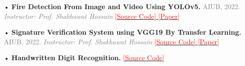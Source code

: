 \vspace{0.5\baselineskip} %

\begin{mycventryy}
{•{\textcolor{text}{\fontsize{8.5}{8.5} \textbf{\hspace{0.4em} \hspace{0.4em}Fire Detection From Image and Video Using YOLOv5. }}}\textcolor{graytext}{\fontsize{8}{8}\textnormal{ AIUB, 2022. \textit{ Instructor: Prof. Shakhawat Hossain}}}
  \href{https://github.com/aarafat27/Fire-Detection-Using-YOLOv5.git}{\textcolor{red}{\fontsize{8}{8}\textnormal{ [Source Code]}}}\href{https://arxiv.org/abs/2310.06351}{\textcolor{red}{\fontsize{8}{8}\textnormal{  [Paper]}}}}
\end{mycventryy}

\vspace{4pt} %

\begin{mycventryy}
  {•{\textcolor{text}{\fontsize{8.5}{8.5} \textbf{\hspace{0.4em} \hspace{0.4em}Signature Verification System using VGG19 By Transfer Learning. }}}\textcolor{graytext}{\fontsize{8}{8}\textnormal{ AIUB, 2022. \textit{ Instructor:  Prof. Shakhawat Hossain}}}
  \href{https://github.com/imtiazhabib17/Signature-Verification-Using-VGG19-By-Transfer-Learning}{\textcolor{red}{\fontsize{8}{8}\textnormal{ [Source Code]}}}\href{https://github.com/imtiazhabib17/Signature-Verification-Using-VGG19-By-Transfer-Learning}{\textcolor{red}{\fontsize{8}{8}\textnormal{  [Paper]}}}}
\end{mycventryy}

\vspace{4pt} %

\begin{mycventryy}
  {•{\textcolor{text}{\fontsize{8.5}{8.5} \textbf{\hspace{0.4em} \hspace{0.4em}Handwritten Digit Recognition.}}}
  \href{https://github.com/imtiazhabib17/Handwritten-Digits-Recognition.git}{\textcolor{red}{\fontsize{8}{8}\textnormal{ [Source Code]}}}}
\end{mycventryy}



